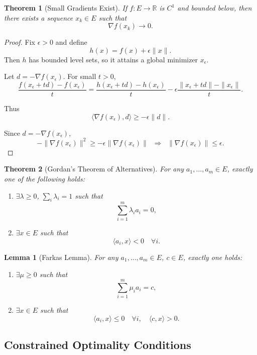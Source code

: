 \documentclass[12pt,oneside]{book}
\numberwithin{equation}{section}
\theoremstyle{definition}
\theoremstyle{plain}
\newtheorem{theorem}{Theorem}[section]
\newtheorem{lemma}{Lemma}[section]
\theoremstyle{remark}
\begin{document}
\begin{theorem}[Small Gradients Exist]
If $f:E \to \mathbb{R}$ is $C^1$ and bounded below, then there exists a sequence $x_k \in E$ such that
\[
\nabla f(x_k) \to 0.
\]
\end{theorem}

\begin{proof}
Fix $\epsilon > 0$ and define
\[
h(x) = f(x) + \epsilon \|x\|.
\]
Then $h$ has bounded level sets, so it attains a global minimizer $x_\epsilon$.

Let $d = -\nabla f(x_\epsilon)$. For small $t > 0$,
\[
\frac{f(x_\epsilon + t d) - f(x_\epsilon)}{t}
=
\frac{h(x_\epsilon + t d) - h(x_\epsilon)}{t}
- \epsilon \frac{\|x_\epsilon + t d\| - \|x_\epsilon\|}{t}.
\]

Thus
\[
\langle \nabla f(x_\epsilon), d \rangle \ge -\epsilon \|d\|.
\]

Since $d = -\nabla f(x_\epsilon)$,
\[
-\|\nabla f(x_\epsilon)\|^2 \ge -\epsilon \|\nabla f(x_\epsilon)\|
\;\;\Rightarrow\;\;
\|\nabla f(x_\epsilon)\| \le \epsilon.
\]
\end{proof}

\begin{theorem}[Gordan's Theorem of Alternatives]
For any $a_1,\dots,a_m \in E$, exactly one of the following holds:
\begin{enumerate}
\item $\exists \lambda \ge 0$, $\sum_i \lambda_i = 1$ such that
\[
\sum_{i=1}^m \lambda_i a_i = 0,
\]
\item $\exists x \in E$ such that
\[
\langle a_i, x \rangle < 0 \quad \forall i.
\]
\end{enumerate}
\end{theorem}

\begin{lemma}[Farkas Lemma]
For any $a_1,\dots,a_m \in E$, $c \in E$, exactly one holds:
\begin{enumerate}
\item $\exists \mu \ge 0$ such that
\[
\sum_{i=1}^m \mu_i a_i = c,
\]
\item $\exists x \in E$ such that
\[
\langle a_i, x \rangle \le 0 \quad \forall i,
\quad \langle c,x \rangle > 0.
\]
\end{enumerate}
\end{lemma}

\subsection*{Constrained Optimality Conditions}
\end{document}
